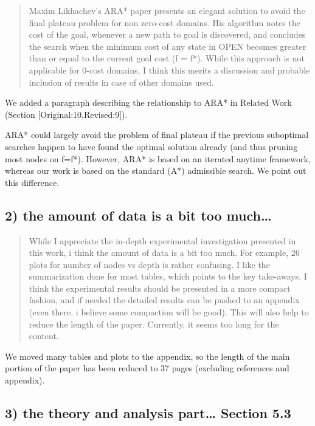 \documentclass{article}
\begin{document}
\begin{quote}
 Maxim Likhachev's ARA* paper presents an elegant solution to
avoid the final plateau problem for non zero-cost domains. His
algorithm notes the cost of the goal, whenever a new path to goal is
discovered, and concludes the search when the minimum cost of any
state in OPEN becomes greater than or equal to the current goal cost
(f = f*). While this approach is not applicable for 0-cost domains, I
think this merits a discussion and probable inclusion of results in
case of other domains used.
\end{quote}

We added a paragraph describing the relationship to ARA* in Related Work (Section [Original:10,Revised:9]).

ARA* could largely avoid the problem of final plateau if the previous suboptimal searches happen to
have found the optimal solution already (and thus pruning most nodes on f=f*). 
However, ARA* is based on an iterated anytime framework, whereas our work is based on the standard (A*) admissible search.
We point out this difference.


\subsection{2) the amount of data is a bit too much\ldots{}}
\label{sec:orgheadline15}

\begin{quote}
 While I appreciate the in-depth experimental investigation
presented in this work, i think the amount of data is a bit too much.
For example, 26 plots for number of nodes vs depth is rather
confusing. I like the summarization done for most tables, which points
to the key take-aways. I think the experimental results should be
presented in a more compact fashion, and if needed the detailed
results can be pushed to an appendix (even there, i believe some
compaction will be good). This will also help to reduce the length of
the paper. Currently, it seems too long for the content.
\end{quote}

We moved many tables and plots to the appendix, so the length of the main portion of the paper has been reduced to 37 pages (excluding references and appendix).

\subsection{\label{orgtarget2} 3) the theory and analysis part\ldots{} Section 5.3}
\label{sec:orgheadline16}
\end{document}
